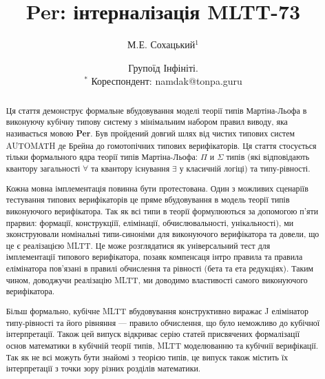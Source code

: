 \documentclass{article}
\begin{document}
\author { М.Е. Сохацький$^1$ }
\title { Per: інтерналізація MLTT-73 }
\date { \small Групоїд Інфініті. \\ \small $^*$ Кореспондент: namdak@tonpa.guru }
\maketitle

\begin{abstract}

Ця стаття демонструє формальне вбудовування моделі теорії типів Мартіна-Льофа
в виконуючу кубічну типову систему з мінімальним набором правил виводу, яка називається мовою {\bf Per}.
Був пройдений довгий шлях від чистих типових систем AUTOMATH де Брейна до
гомотопічних типових верифікаторів. Ця стаття стосується тільки формального ядра
теорії типів Мартіна-Льофа: $\Pi$ и $\Sigma$ типів (які відповідають
квантору загальності $\forall$ та квантору існування $\exists$ у класичній логіці)
та типу-рівності.

Кожна мовна імплементація повинна бути протестована. Один з можливих сценаріїв
тестування типових верифікаторів це пряме вбудовування в модель теорії типів
виконуючого верифікатора. Так як всі типи в теорії формулюються за допомогою п'яти
прарвил: формації, конструкціїї, елімінації, обчислювальності, унікальності), ми зконструювали
номінальні типи-синоніми для виконуючого верифікатора та довели, що це є реалізацією MLTT.
Це може розглядатися як універсальний тест для імплементації типового верифікатора,
позаяк компенсаця інтро правила та правила елімінатора пов'язані в правилі
обчислення та рівності (бета та ета редукціях). Таким чином, доводжучи реалізацію MLTT,
ми доводимо властивості самого виконуючого верифікатора.

Більш формально, кубічне MLTT вбудовування конструктивно виражає
J елімінатор типу-рівності та його рівняння — правило обчислення,
що було неможливо до кубічної інтерпретації. Також цей випуск
відкриває серію статей присвячених формалізації основ математики в кубічній теорії типів,
MLTT моделюванню та кубічнії верифікації. Так як не всі можуть бути знайомі з теорією типів,
це випуск також містить їх інтерпретації з точки зору різних розділів математики.

\end{abstract}
\end{document}
